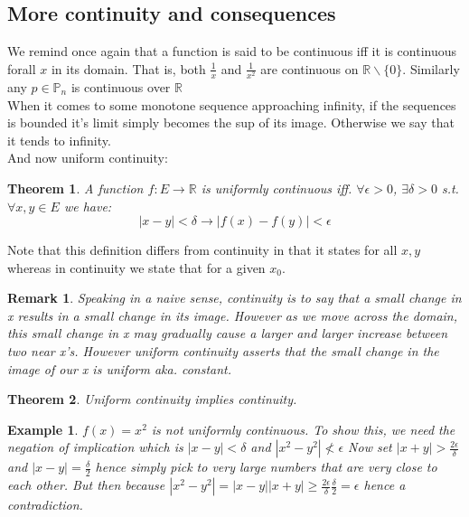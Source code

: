 \documentclass[titlepage]{article}
\newtheorem{remark}{Remark}[section]
\newtheorem{theorem}{Theorem}[section]
\numberwithin{equation}{subsection}
\newtheorem{example}{Example}[section]
\begin{document}
\subsection{More continuity and consequences}

We remind once again that a function is said to be continuous iff it is continuous forall $x$ in its domain. That is, both $\frac{1}{x}$ and $\frac{1}{x^{2}}$ are continuous on $\mathbb{R}\backslash\{0\}$. Similarly any $p \in \mathbb{P}_{n}$ is continuous over $\mathbb{R}$
\\

When it comes to some monotone sequence approaching infinity, if the sequences is bounded it's limit simply becomes the sup of its image. Otherwise we say that it tends to infinity. 
\\

And now uniform continuity:
\begin{theorem}
A function $f:E \to \mathbb{R}$ is uniformly continuous iff. $\forall \epsilon > 0$, $\exists \delta > 0$ s.t. $\forall x,y \in E$ we have:
$$|x-y| < \delta \rightarrow |f(x) - f(y)|<\epsilon$$
\end{theorem}
Note that this definition differs from continuity in that it states for all $x,y$ whereas in continuity we state that for a given $x_{0}$. 
\\

\begin{tcolorbox}
\begin{remark}
       Speaking in a naive sense, continuity is to say that a small change in x results in a small change in its image. However as we move across the domain, this small change in x may gradually cause a larger and larger increase between two near x's. However uniform continuity asserts that the small change in the image of our x is uniform aka. constant. 
\end{remark}
\end{tcolorbox}

\begin{theorem}
Uniform continuity implies continuity. 
\end{theorem}

\begin{example}
$f(x) = x^2$ is not uniformly continuous. To show this, we need the negation of implication which is $|x-y|<\delta$ and $|x^{2} - y^{2}|\not<\epsilon$ Now set $|x+y|>\frac{2\epsilon}{\delta}$ and $|x-y| = \frac{\delta}{2}$ hence simply pick to very large numbers that are very close to each other. But then because $|x^2 - y^2| = |x-y||x+y| \geq \frac{2\epsilon}{\delta}\frac{\delta}{2} = \epsilon$ hence a contradiction. 
\end{example}
\end{document}
